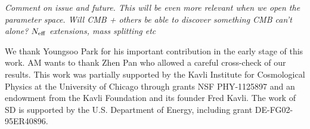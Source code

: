 \documentclass[aps,prd,reprint,superscriptaddress]{revtex4-1}
\begin{document}
\textit{Comment on issue and future. This will be even more relevant when we open the parameter space. Will CMB + others be able to discover something CMB can't alone? $N_{\rm eff}$ extensions, mass splitting etc}





\begin{acknowledgments}
We thank Youngsoo Park for his important contribution in the early stage of this work.
AM wants to thank Zhen Pan who allowed a careful cross-check of our results.
This work was partially supported by the Kavli Institute for Cosmological Physics at the University of Chicago through grants NSF PHY-1125897 and an endowment from the Kavli Foundation and its founder Fred Kavli.
The work of SD is supported by the U.S. Department of Energy, including grant DE-FG02-95ER40896.
\end{acknowledgments}


\end{document}
